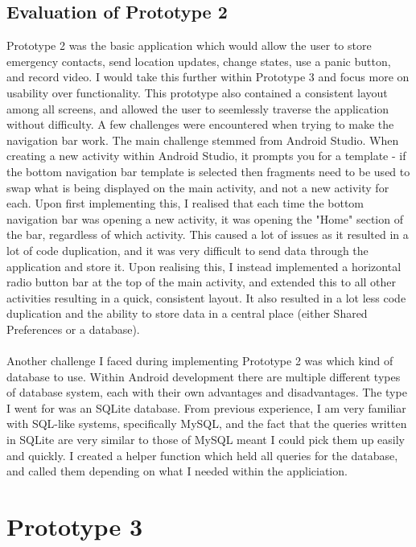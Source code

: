 \documentclass[a4paper]{report}
\begin{document}
\subsection{Evaluation of Prototype 2}
\label{sec:EvalPrototype2}
Prototype 2 was the basic application which would allow the user to store emergency contacts, send location updates, change states, use a panic button, and record video. I would take this further within Prototype 3 and focus more on usability over functionality.
This prototype also contained a consistent layout among all screens, and allowed the user to seemlessly traverse the application without difficulty. A few challenges were encountered when trying to make the navigation bar work. The main challenge stemmed from Android Studio\cite{androidstudio}. When creating a new activity within Android Studio, it prompts you for a template - if the bottom navigation bar template is selected then fragments need to be used to swap what is being displayed on the main activity, and not a new activity for each. Upon first implementing this, I realised that each time the bottom navigation bar was opening a new activity, it was opening the "Home" section of the bar, regardless of which activity. This caused a lot of issues as it resulted in a lot of code duplication, and it was very difficult to send data through the application and store it. Upon realising this, I instead implemented a horizontal radio button bar at the top of the main activity, and extended this to all other activities resulting in a quick, consistent layout. It also resulted in a lot less code duplication and the ability to store data in a central place (either Shared Preferences or a database). \\\\
Another challenge I faced during implementing Prototype 2 was which kind of database to use. Within Android development there are multiple different types of database system, each with their own advantages and disadvantages. The type I went for was an SQLite database. From previous experience, I am very familiar with SQL-like systems, specifically MySQL, and the fact that the queries written in SQLite are very similar to those of MySQL meant I could pick them up easily and quickly. I created a helper function which held all queries for the database, and called them depending on what I needed within the appliciation. 

\section{Prototype 3} 
\label{sec:Prototype3}
\end{document}
